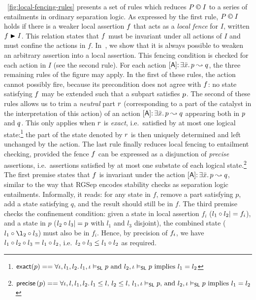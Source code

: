 \fig~\ref{fig:local-fencing-rules} presents a set of
rules which reduces  $P \containI I$ to a series of entailments in
ordinary separation logic. As expressed by the first rule,
$P \containI I$ holds if there is a weaker local assertion $\lass{F}$
that acts as a \emph{local fence} for $I$, written 
$\lass{F}\strictfences I$. This relation states that  $\lass{F}$
must be invariant under all actions of $I$ and must confine the
actions in $f$.  In~\cite{colosl-tr14},
we show that it is always possible to weaken an arbitrary assertion into a local assertion. This fencing condition is
checked for each action in $I$ (see the second rule). For each action
$\interAss{[\token{A}]}{\bar x}{\lass{P}}{\lass{Q}}$, the three remaining rules of the figure may
apply. In the first of these rules, the action cannot possibly fire,
because its precondition does not agree with $\lass{F}$: no state
satisfying $\lass{F}$ may be extended such that a subpart satisfies
$\lass{P}$. 
The second of these rules allows us to trim a \emph{neutral} part
$\lass{R}$ (corresponding to a part of the catalyst in the
interpretation of this action) of an action
$\interAss{[\token{A}]}{\bar x}{\lass{P}}{\lass{Q}}$ appearing both in
$\lass{P}$ and $\lass{Q}$. This only applies when $\lass{R}$ is
\emph{exact}, i.e.\ satisfied by at most one logical
state:\footnote{$\textsf{exact}(p) == \forall \iota, l_1, l_2.\, l_1, \iota \mathrel{\vDash_{\mathsf{SL}}}
  p\text{ and }l_2, \iota \mathrel{\vDash_{\mathsf{SL}}} p\text{ implies } l_1 = l_2$} the
part of the state denoted by $\lass{R}$ is then uniquely determined
and left unchanged by the action.  The last rule finally reduces local
fencing to entailment checking, provided the fence $\lass{F}$ can be
expressed as a disjunction of \emph{precise} assertions,
i.e.\ assertions satisfied by at most one substate of each logical
state.\footnote{$\textsf{precise} \left( p \right) == \forall \iota, l, l_1, l_2.\, l_1\leq
  l\text{, }l_2\leq l\text{, }l_1, \iota \mathrel{\vDash_{\mathsf{SL}}} p\text{, and }l_2,
  \iota \mathrel{\vDash_{\mathsf{SL}}} p \text{ implies } l_1 = l_2$} The first premise states
that $\lass{F}$ is invariant under the action
$\interAss{[\token{A}]}{\bar x}{\lass{P}}{\lass{Q}}$, similar to the
way that RGSep encodes stability checks as separation logic
entailments. Informally, it reads: for any state in $f$, remove a part
satisfying $p$, add a state satisfying $q$, and the result should
still be in $f$. The third premise checks the confinement condition:
given a state in local assertion $f_i$ ($l_1\composeL l_2|=
\lass{F}_i$), and a state in $p$ ($l_2 \circ l_3 |= p$ with $l_1$
and $l_3 $ disjoint), the combined state ($l_1 \composeL \l_2
\composeL l_3$) must also be in $f_i$. Hence, by precision of
$\lass{F}_i$, we have $l_1\circ l_2\circ
l_3 = l_1\circ l_2$, i.e.\ $l_2\circ l_3 \leq l_1\circ
l_2$ as required.



